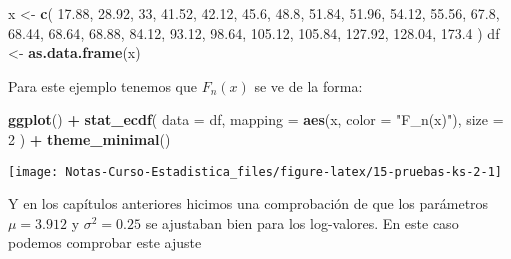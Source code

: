 \documentclass[
  12pt,
]{book}
\newenvironment{Shaded}{\begin{snugshade}}{\end{snugshade}}
\newcommand{\DataTypeTok}[1]{\textcolor[rgb]{0.13,0.29,0.53}{#1}}
\newcommand{\DecValTok}[1]{\textcolor[rgb]{0.00,0.00,0.81}{#1}}
\newcommand{\FloatTok}[1]{\textcolor[rgb]{0.00,0.00,0.81}{#1}}
\newcommand{\KeywordTok}[1]{\textcolor[rgb]{0.13,0.29,0.53}{\textbf{#1}}}
\newcommand{\NormalTok}[1]{#1}
\newcommand{\OperatorTok}[1]{\textcolor[rgb]{0.81,0.36,0.00}{\textbf{#1}}}
\newcommand{\StringTok}[1]{\textcolor[rgb]{0.31,0.60,0.02}{#1}}
\begin{document}
\begin{Shaded}
\begin{Highlighting}[]
\NormalTok{x \textless{}{-}}\StringTok{ }\KeywordTok{c}\NormalTok{(}
  \FloatTok{17.88}\NormalTok{, }\FloatTok{28.92}\NormalTok{, }\DecValTok{33}\NormalTok{, }\FloatTok{41.52}\NormalTok{, }\FloatTok{42.12}\NormalTok{, }\FloatTok{45.6}\NormalTok{, }\FloatTok{48.8}\NormalTok{, }\FloatTok{51.84}\NormalTok{, }\FloatTok{51.96}\NormalTok{, }\FloatTok{54.12}\NormalTok{, }\FloatTok{55.56}\NormalTok{,}
  \FloatTok{67.8}\NormalTok{, }\FloatTok{68.44}\NormalTok{, }\FloatTok{68.64}\NormalTok{, }\FloatTok{68.88}\NormalTok{, }\FloatTok{84.12}\NormalTok{, }\FloatTok{93.12}\NormalTok{, }\FloatTok{98.64}\NormalTok{, }\FloatTok{105.12}\NormalTok{, }\FloatTok{105.84}\NormalTok{, }\FloatTok{127.92}\NormalTok{,}
  \FloatTok{128.04}\NormalTok{, }\FloatTok{173.4}
\NormalTok{)}
\NormalTok{df \textless{}{-}}\StringTok{ }\KeywordTok{as.data.frame}\NormalTok{(x)}
\end{Highlighting}
\end{Shaded}

Para este ejemplo tenemos que \(F_n(x)\) se ve de la forma:

\begin{Shaded}
\begin{Highlighting}[]
\KeywordTok{ggplot}\NormalTok{() }\OperatorTok{+}
\StringTok{  }\KeywordTok{stat\_ecdf}\NormalTok{(}
    \DataTypeTok{data =}\NormalTok{ df,}
    \DataTypeTok{mapping =} \KeywordTok{aes}\NormalTok{(x, }\DataTypeTok{color =} \StringTok{"F\_n(x)"}\NormalTok{),}
    \DataTypeTok{size =} \DecValTok{2}
\NormalTok{  ) }\OperatorTok{+}
\StringTok{  }\KeywordTok{theme\_minimal}\NormalTok{()}
\end{Highlighting}
\end{Shaded}

\begin{center}\texttt{[image: Notas-Curso-Estadistica\_files/figure-latex/15-pruebas-ks-2-1]} \end{center}

Y en los capítulos anteriores hicimos una comprobación de que los parámetros
\(\mu =3.912\) y \(\sigma ^{2} = 0.25\) se ajustaban bien para los log-valores.
En este caso podemos comprobar este ajuste
\end{document}
